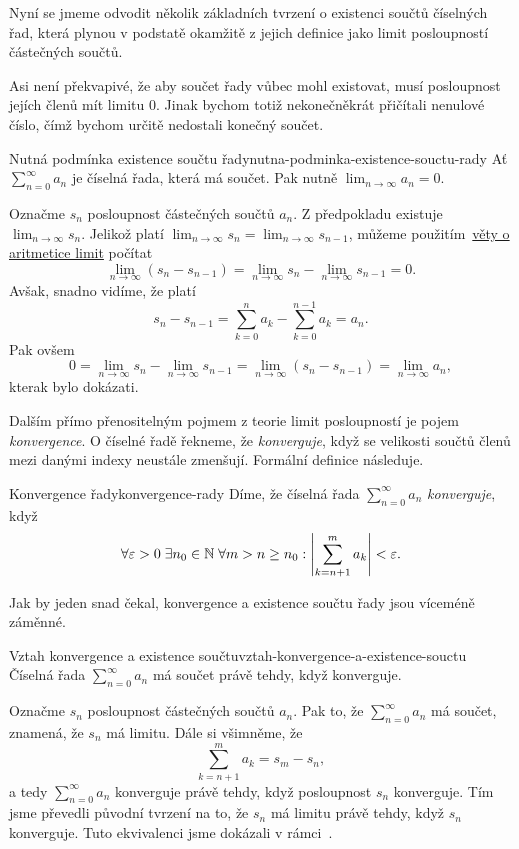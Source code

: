 Nyní se jmeme odvodit několik základních tvrzení o existenci součtů číselných
řad, která plynou v podstatě okamžitě z jejich definice jako limit posloupností
částečných součtů.

Asi není překvapivé, že aby součet řady vůbec mohl existovat, musí posloupnost
jejích členů mít limitu $0$. Jinak bychom totiž nekonečněkrát přičítali nenulové
číslo, čímž bychom určitě nedostali konečný součet.

\begin{lemma}{Nutná podmínka existence součtu
 řady}{nutna-podminka-existence-souctu-rady}
 Ať $\sum_{n=0}^{\infty} a_n$ je číselná řada, která má součet. Pak nutně
 $\lim_{n \to \infty} a_n = 0$.
\end{lemma}
\begin{lemproof}
 Označme $s_n$ posloupnost částečných součtů $a_n$. Z předpokladu existuje
 $\lim_{n \to \infty} s_n$. Jelikož platí $\lim_{n \to \infty} s_n = \lim_{n \to
 \infty} s_{n-1}$, můžeme použitím~\hyperref[thm:aritmetika-limit]{věty o
 aritmetice limit} počítat
 \[
  \lim_{n \to \infty} (s_n - s_{n-1}) = \lim_{n \to \infty} s_n - \lim_{n \to
  \infty} s_{n-1} = 0.
 \]
 Avšak, snadno vidíme, že platí
 \[
  s_n - s_{n-1} = \sum_{k=0}^n a_k - \sum_{k=0}^{n-1} a_k = a_n.
 \]
 Pak ovšem
 \[
  0 = \lim_{n \to \infty} s_n - \lim_{n \to \infty} s_{n-1} = \lim_{n \to
  \infty} (s_n - s_{n-1}) = \lim_{n \to \infty} a_n,
 \]
 kterak bylo dokázati.
\end{lemproof}

Dalším přímo přenositelným pojmem z teorie limit posloupností je pojem
\emph{konvergence}. O číselné řadě řekneme, že \emph{konverguje}, když se
velikosti součtů členů mezi danými indexy neustále zmenšují. Formální definice
následuje.

\begin{definition}{Konvergence řady}{konvergence-rady}
 Díme, že číselná řada $\sum_{n=0}^{\infty} a_n$ \emph{konverguje}, když
 \[
 \forall \varepsilon > 0 \; \exists n_0 \in \mathbb{N} \; \forall m > n \geq n_0:\left|
 \sum_{k=n+1}^m a_k \right| < \varepsilon.
 \]
\end{definition}

Jak by jeden snad čekal, konvergence a existence součtu řady jsou víceméně
záměnné.

\begin{proposition}{Vztah konvergence a existence
 součtu}{vztah-konvergence-a-existence-souctu}
 Číselná řada $\sum_{n=0}^{\infty} a_n$ má součet právě tehdy, když konverguje.
\end{proposition}
\begin{propproof}
 Označme $s_n$ posloupnost částečných součtů $a_n$. Pak to, že
 $\sum_{n=0}^{\infty} a_n$ má součet, znamená, že $s_n$ má limitu. Dále si
 všimněme, že
 \[
  \sum_{k=n+1}^m a_k = s_m - s_n,
 \]
 a tedy $\sum_{n=0}^{\infty} a_n$ konverguje právě tehdy, když posloupnost $s_n$
 konverguje. Tím jsme převedli původní tvrzení na to, že $s_n$ má limitu právě
 tehdy, když $s_n$ konverguje. Tuto ekvivalenci jsme dokázali v
 rámci~.
\end{propproof}
